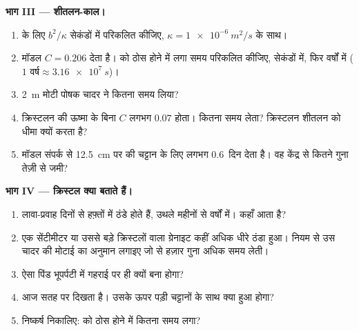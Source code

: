 \begin{problem}
\medskip
\noindent\textbf{भाग III --- शीतलन-काल।}
\begin{enumerate}[resume]
  \item {} के लिए $b^2/\kappa$ सेकंडों में परिकलित कीजिए,
        $\kappa = \qty{1e-6}{m^2/s}$ के साथ।
  \item मॉडल $C = 0.206$ देता है।  को ठोस होने में लगा समय परिकलित कीजिए,
        सेकंडों में, फिर वर्षों में ($\num{1}\text{ वर्ष} \approx \qty{3.16e7}{s}$)।
  \item \qty{2}{m} मोटी पोषक चादर ने कितना समय लिया?
  \item क्रिस्टलन की ऊष्मा के बिना $C$ लगभग $0.07$ होता।
         कितना समय लेता? क्रिस्टलन शीतलन को धीमा क्यों
        करता है?
  \item मॉडल संपर्क से \qty{12.5}{cm} पर की चट्टान के लिए लगभग \num{0.6}~दिन
        देता है। वह केंद्र से कितने गुना तेज़ी से
        जमी?
\end{enumerate}

\medskip
\noindent\textbf{भाग IV --- क्रिस्टल क्या बताते हैं।}
\begin{enumerate}[resume]
  \item लावा-प्रवाह दिनों से हफ़्तों में ठंडे होते हैं, उथले  महीनों से
        वर्षों में।  कहाँ आता है?
  \item एक सेंटीमीटर या उससे बड़े क्रिस्टलों वाला ग्रेनाइट कहीं अधिक
        धीरे ठंडा हुआ। नियम से उस चादर की मोटाई का अनुमान लगाइए जो
         से हज़ार गुना अधिक समय लेती।
  \item ऐसा पिंड भूपर्पटी में गहराई पर ही क्यों बना होगा?
  \item {} आज सतह पर दिखता है। उसके ऊपर पड़ी चट्टानों के साथ क्या
        हुआ होगा?
  \item निष्कर्ष निकालिए:  को ठोस होने में कितना समय लगा?
\end{enumerate}
\end{problem}
